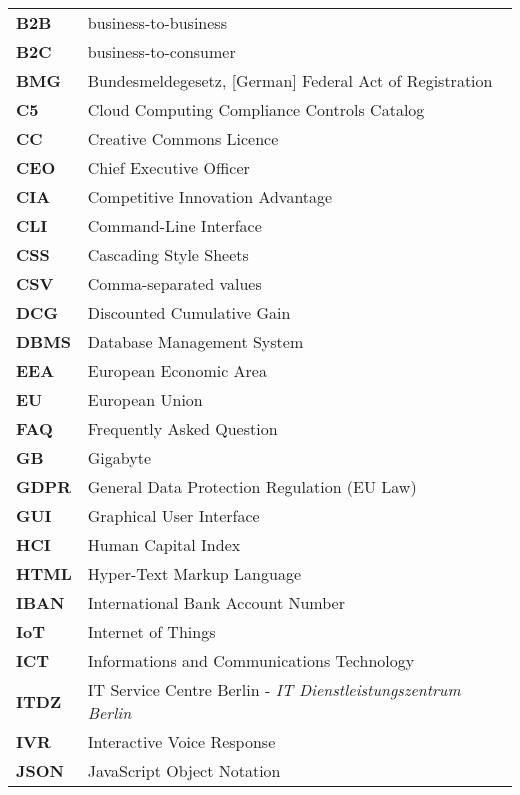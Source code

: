 \begin{flushleft}
\begin{tabular}{ll}
\textbf{B2B}	&	business-to-business\\
\textbf{B2C}	&	business-to-consumer\\
\textbf{BMG}	&	Bundesmeldegesetz, [German] Federal Act of Registration\\

\textbf{ C5} & Cloud Computing Compliance Controls Catalog\\
\textbf{CC}		&	Creative Commons Licence\\
\textbf{CEO}	&	Chief Executive Officer\\
\textbf{CIA}	&	Competitive Innovation Advantage\\
\textbf{CLI}	&	Command-Line Interface\\
\textbf{CSS}	&	Cascading Style Sheets\\
\textbf{CSV}	&	Comma-separated values\\

\textbf{DCG}	&	Discounted Cumulative Gain\\
\textbf{DBMS}	&	Database Management System\\


\textbf{EEA}		&	European Economic Area\\
\textbf{EU}		&	European Union\\


\textbf{FAQ}	&	Frequently Asked Question\\

\textbf{GB}		&	Gigabyte\\
\textbf{GDPR}	&	General Data Protection Regulation (EU Law)\\
\textbf{GUI}	&	Graphical User Interface\\

\textbf{HCI}	&	Human Capital Index\\
\textbf{HTML}	&	Hyper-Text Markup Language\\

\textbf{IBAN}	&	International Bank Account Number\\
\textbf{IoT}	&	Internet of Things\\
\textbf{ICT}	&	Informations and Communications Technology\\
\textbf{ITDZ}	&	IT Service Centre Berlin - \textit{IT Dienstleistungszentrum Berlin}\\

\textbf{IVR}	&	Interactive Voice Response\\

\textbf{JSON}	&	JavaScript Object Notation\\


\end{tabular}
\end{flushleft}
